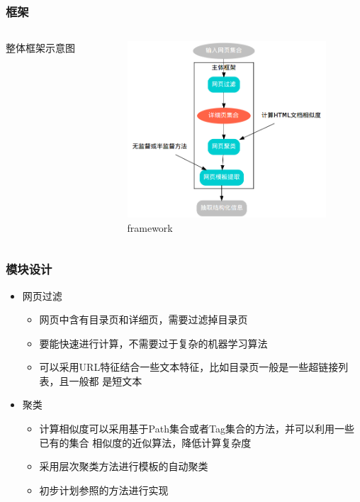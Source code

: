\documentclass[11pt,presentation]{beamer}
\begin{document}
\begin{frame}
\frametitle{框架}
\label{sec-2-4}
\begin{columns}[t]
\begin{column}{0.3\textwidth}
\label{sec-2-4-1}

整体框架示意图
\end{column}
\begin{column}{0.7\textwidth}
\label{sec-2-4-2}

    \begin{figure}[htb]
    \centering
    \includegraphics[width=20em,angle=0]{./framework.png}
    \caption{\label{fig:1}framework}
    \end{figure}
\end{column}
\end{columns}
\end{frame}
\begin{frame}
\frametitle{模块设计}
\label{sec-2-5}
\begin{itemize}

\item 网页过滤
\label{sec-2-5-1}%
\begin{itemize}
\item 网页中含有目录页和详细页，需要过滤掉目录页
\item 要能快速进行计算，不需要过于复杂的机器学习算法
\item 可以采用URL特征结合一些文本特征，比如目录页一般是一些超链接列表，且一般都
      是短文本
\end{itemize}

\item 聚类
\label{sec-2-5-2}%
\begin{itemize}
\item 计算相似度可以采用基于Path集合或者Tag集合的方法，并可以利用一些已有的集合
       相似度的近似算法，降低计算复杂度
\item 采用层次聚类方法进行模板的自动聚类
\item 初步计划参照\cite{4,5,6}的方法进行实现
\end{itemize}
\end{itemize} %
\end{frame}
\end{document}
